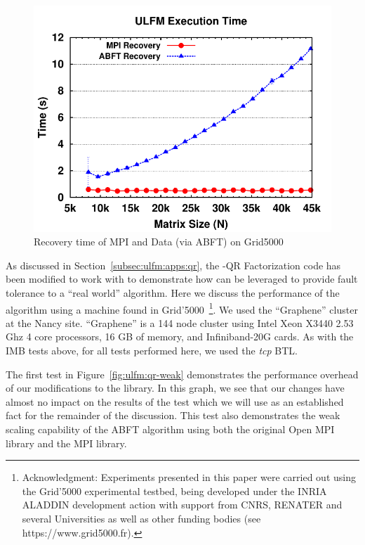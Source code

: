 \begin{figure}[t]
    \centering
    \includegraphics[width=\linewidth]{figures/g5k_results_ulfm}
    \caption{Recovery time of MPI and Data (via ABFT) on Grid5000}
    \label{fig:ulfm:qr-recovery}
\end{figure}

As discussed in Section~\ref{subsec:ulfm:apps:qr}, the \abft-QR Factorization code 
has been modified to work with \ulfm to demonstrate how \ulfm can be leveraged to 
provide fault tolerance to a ``real world'' algorithm. Here we discuss the 
performance of the algorithm using a machine found in 
Grid'5000~\footnote{ Acknowledgment: Experiments presented in this paper were 
carried out using the Grid'5000 experimental testbed, being developed under the 
INRIA ALADDIN development action with support from CNRS, RENATER and several 
Universities as well as other funding bodies (see https://www.grid5000.fr).}. We 
used the ``Graphene'' cluster at the Nancy site. ``Graphene'' is a 144 node 
cluster using Intel Xeon X3440 2.53 Ghz 4 core processors, 16 GB of memory, and 
Infiniband-20G cards. As with the IMB tests above, for all tests performed here, 
we used the \textit{tcp} BTL.

The first test in Figure~\ref{fig:ulfm:qr-weak} demonstrates the performance overhead 
of our modifications to the \ulfm library. In this graph, we see that our changes have 
almost no impact on the results of the test which we will use as an established fact 
for the remainder of the discussion. This test also demonstrates the weak scaling 
capability of the ABFT algorithm using both the original Open MPI library and the \ulfm 
MPI library. 

